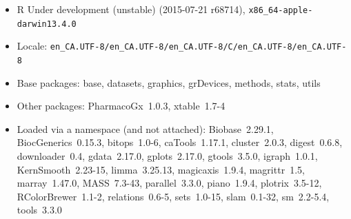 \documentclass[11pt]{article}
\begin{document}
\begin{itemize}\raggedright
  \item R Under development (unstable) (2015-07-21 r68714), \verb|x86_64-apple-darwin13.4.0|
  \item Locale: \verb|en_CA.UTF-8/en_CA.UTF-8/en_CA.UTF-8/C/en_CA.UTF-8/en_CA.UTF-8|
  \item Base packages: base, datasets, graphics, grDevices, methods,
    stats, utils
  \item Other packages: PharmacoGx~1.0.3, xtable~1.7-4
  \item Loaded via a namespace (and not attached): Biobase~2.29.1,
    BiocGenerics~0.15.3, bitops~1.0-6, caTools~1.17.1, cluster~2.0.3,
    digest~0.6.8, downloader~0.4, gdata~2.17.0, gplots~2.17.0,
    gtools~3.5.0, igraph~1.0.1, KernSmooth~2.23-15, limma~3.25.13,
    magicaxis~1.9.4, magrittr~1.5, marray~1.47.0, MASS~7.3-43,
    parallel~3.3.0, piano~1.9.4, plotrix~3.5-12, RColorBrewer~1.1-2,
    relations~0.6-5, sets~1.0-15, slam~0.1-32, sm~2.2-5.4, tools~3.3.0
\end{itemize}


\end{document}
